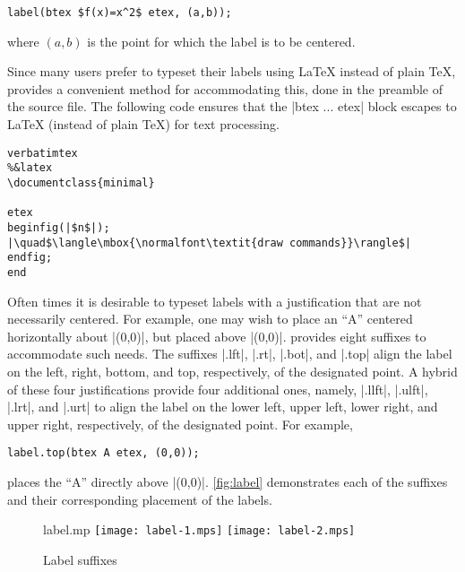 \begin{lstlisting}[style=MP]
label(btex $f(x)=x^2$ etex, (a,b));
\end{lstlisting}
where $(a,b)$ is the point for which the label is to be centered.

Since many \MP{} users prefer to typeset their labels using \LaTeX{}
instead of plain \TeX, \MP{} provides a convenient method for
accommodating this, done in the preamble of the \MP{} source file.  The
following code ensures that the |btex ... etex| block escapes to
\LaTeX{} (instead of plain \TeX) for text processing.

\begin{lstlisting}[style=MP]
verbatimtex
%&latex
\documentclass{minimal}

etex
beginfig(|$n$|);
|\quad$\langle\mbox{\normalfont\textit{draw commands}}\rangle$|
endfig;
end
\end{lstlisting}

Often times it is desirable to typeset labels with a justification that
are not necessarily centered.  For example, one may wish to place an
``A'' centered horizontally about |(0,0)|, but placed above
|(0,0)|. \MP{} provides eight suffixes to accommodate such needs.  The
suffixes |.lft|, |.rt|, |.bot|, and |.top| align the label on the left,
right, bottom, and top, respectively, of the designated point.  A hybrid
of these four justifications provide four additional ones, namely,
|.llft|, |.ulft|, |.lrt|, and |.urt| to align the label on the lower
left, upper left, lower right, and upper right, respectively, of the
designated point.  For example,

\begin{lstlisting}[style=MP]
label.top(btex A etex, (0,0));
\end{lstlisting}
places the ``A'' directly above |(0,0)|.  \autoref{fig:label}
demonstrates each of the suffixes and their corresponding placement of
the labels.

\begin{figure}
  \begin{withattachment}{label.mp}
    \hfill%
    \texttt{[image: label-1.mps]}%
    \hfill%
    \texttt{[image: label-2.mps]}%
    \hfill\mbox{}%
  \end{withattachment}
  \caption{Label suffixes}
  \label{fig:label}
\end{figure}
